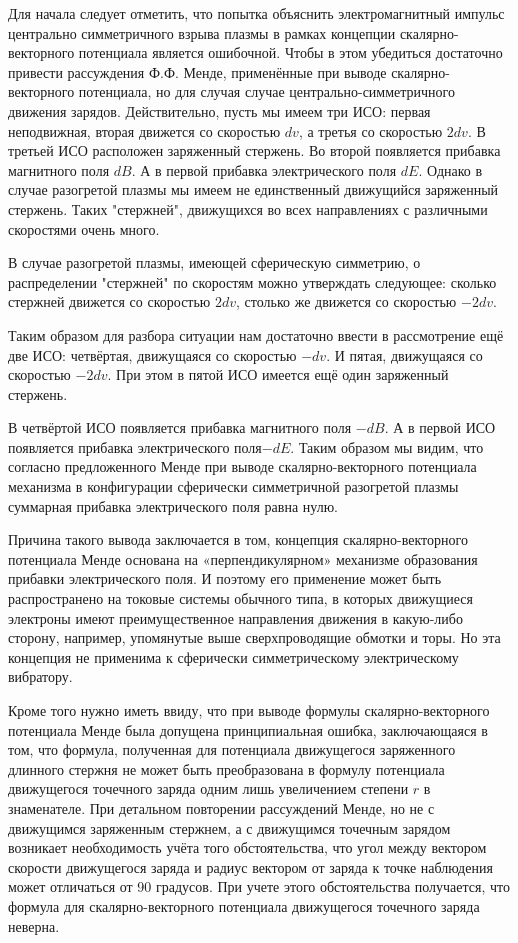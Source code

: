 \documentclass[12pt]{article}
\begin{document}
Для начала следует отметить, что попытка объяснить электромагнитный импульс центрально симметричного взрыва плазмы в рамках концепции скалярно-векторного потенциала является ошибочной. Чтобы в этом убедиться достаточно привести рассуждения Ф.Ф. Менде, применённые при выводе скалярно-векторного потенциала, но для случая случае центрально-симметричного движения зарядов.
Действительно, пусть мы имеем три ИСО: первая неподвижная, вторая движется со скоростью $dv$, а третья со скоростью $2dv$. В третьей ИСО расположен заряженный стержень. Во второй появляется прибавка магнитного поля $dB$. А в первой прибавка электрического поля $dE$.
Однако в случае разогретой плазмы мы имеем не единственный движущийся заряженный стержень. Таких "стержней", движущихся во всех направлениях с различными скоростями очень много.

В случае разогретой плазмы, имеющей сферическую симметрию, о распределении "стержней" по скоростям можно утверждать следующее: сколько стержней движется со скоростью $2dv$, столько же движется со скоростью $-2dv$.

Таким образом для разбора ситуации нам достаточно ввести в рассмотрение ещё две ИСО: четвёртая, движущаяся со скоростью $-dv$. И пятая, движущаяся со скоростью $-2dv$. При этом в пятой ИСО имеется ещё один заряженный стержень.

В четвёртой ИСО появляется прибавка магнитного поля $-dB$. А в первой ИСО появляется прибавка электрического поля$-dE$.
Таким образом мы видим, что согласно предложенного Менде при выводе скалярно-векторного потенциала механизма в конфигурации сферически симметричной разогретой плазмы суммарная прибавка электрического поля равна нулю.

Причина такого вывода заключается в том, концепция скалярно-векторного потенциала Менде основана на «перпендикулярном» механизме образования прибавки электрического поля. И поэтому его применение может быть распространено на токовые системы обычного типа, в которых движущиеся электроны имеют преимущественное направления движения в какую-либо сторону, например, упомянутые выше сверхпроводящие обмотки и торы. Но эта концепция не применима к сферически симметрическому электрическому вибратору.

Кроме того нужно иметь ввиду, что при выводе формулы скалярно-векторного потенциала Менде была допущена принципиальная ошибка, заключающаяся в том, что формула, полученная для потенциала движущегося заряженного длинного стержня не может быть преобразована в формулу потенциала движущегося точечного заряда одним лишь увеличением степени  $r$  в знаменателе. При детальном повторении рассуждений Менде, но не с движущимся заряженным стержнем, а с движущимся точечным зарядом возникает необходимость учёта того обстоятельства, что угол между вектором скорости движущегося заряда и радиус вектором от заряда к точке наблюдения может отличаться от 90 градусов. При учете этого обстоятельства получается, что формула для скалярно-векторного потенциала движущегося точечного заряда неверна.
\end{document}
